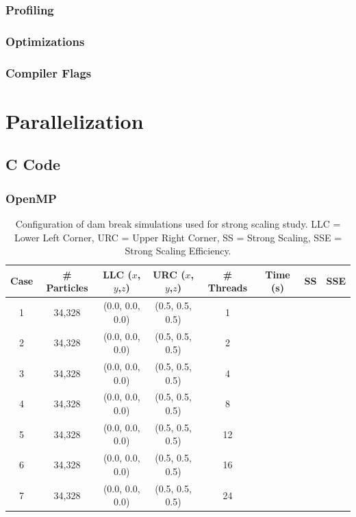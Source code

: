 \documentclass{scrartcl}
\begin{document}
  \subsubsection{Profiling}
  
  \subsubsection{Optimizations}
  \subsubsection{Compiler Flags}
  
  
  \section{Parallelization}
  \subsection{C Code}  
  \subsubsection{OpenMP}
  \begin{table}
  	\begin{tabular}{| c | c | c | c | c | c | c | c |}
  		\hline
  	Case & \# Particles & LLC ($x$,$y$,$z$) & URC ($x$,$y$,$z$) & \# Threads & Time (s) & SS & SSE \\ \hline
	1 & 34,328 & (0.0, 0.0, 0.0) & (0.5, 0.5, 0.5) & 1 & & & \\ \hline		  		
	2 & 34,328 & (0.0, 0.0, 0.0) & (0.5, 0.5, 0.5) & 2 & & & \\ \hline		  		
	3 & 34,328 & (0.0, 0.0, 0.0) & (0.5, 0.5, 0.5) & 4 & & & \\ \hline		  		
	4 & 34,328 & (0.0, 0.0, 0.0) & (0.5, 0.5, 0.5) & 8 & & & \\ \hline		  		
	5 & 34,328 & (0.0, 0.0, 0.0) & (0.5, 0.5, 0.5) & 12 & & & \\ \hline		  		
	6 & 34,328 & (0.0, 0.0, 0.0) & (0.5, 0.5, 0.5) & 16 & & & \\ \hline		  		
	7 & 34,328 & (0.0, 0.0, 0.0) & (0.5, 0.5, 0.5) & 24 & & & \\ \hline		  		
	\end{tabular}
	\caption{Configuration of dam break simulations used for strong scaling study. LLC = Lower Left Corner, URC = Upper Right Corner, SS = Strong Scaling, SSE = Strong Scaling Efficiency.}
	\label{tab:ss}
  \end{table}
  
\end{document}
